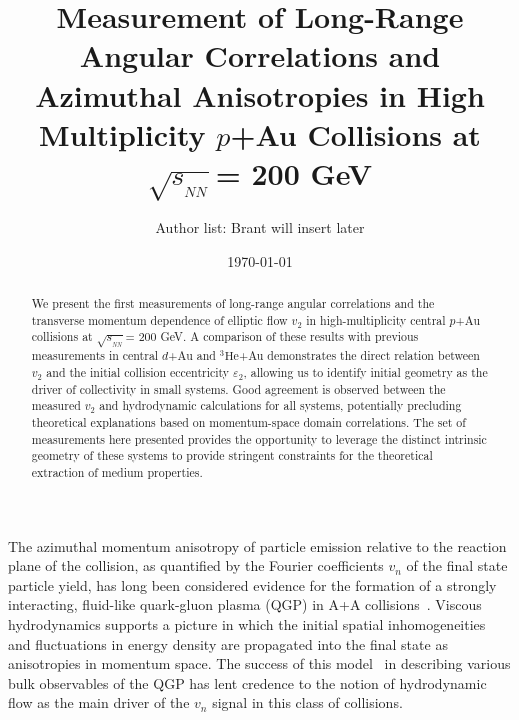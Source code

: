 \documentclass[%
reprint,
showpacs,preprintnumbers,
 amsmath,amssymb,
 aps,
]{revtex4-1}
\newcommand{\sqsn}{\mbox{$\sqrt{s_{_{NN}}}$}\xspace}
\newcommand{\dau}{\mbox{$d$+Au}\xspace}
\newcommand{\pau}{\mbox{$p$+Au}\xspace}
\newcommand{\hau}{\mbox{$^3\text{He}$+Au}\xspace}
\begin{document}
\title{Measurement of Long-Range Angular Correlations and Azimuthal Anisotropies in High Multiplicity \pau Collisions at \sqsn = 200 GeV}%

\author{Author list: Brant will insert later}

\date{\today}%

\begin{abstract}
We present the first measurements of long-range angular correlations and the transverse momentum dependence of elliptic flow $v_2$ in high-multiplicity central \pau collisions at \sqsn = 200 GeV. A comparison of these results with previous measurements in central \dau and \hau demonstrates the direct relation between $v_2$ and the initial collision eccentricity $\varepsilon_2$, allowing us to identify initial geometry as the driver of collectivity in small systems. Good agreement is observed between the measured $v_2$ and hydrodynamic calculations for all systems, potentially precluding theoretical explanations based on momentum-space domain correlations. The set of measurements here presented provides the opportunity to leverage the distinct intrinsic geometry of these systems to provide stringent constraints for the theoretical extraction of medium properties. 
\end{abstract}

\maketitle

The azimuthal momentum anisotropy of particle emission relative to the reaction plane of the collision, as quantified by the Fourier coefficients $v_n$ of the final state particle yield, has long been considered evidence for the formation of a strongly interacting, fluid-like quark-gluon plasma (QGP) in A+A collisions~\cite{Snellings:2011sz}. Viscous hydrodynamics supports a picture in which the initial spatial inhomogeneities and fluctuations in energy density are propagated into the final state as anisotropies in momentum space.  The success of this model~\cite{Luzum:2008cw} in describing various bulk observables of the QGP has lent credence to the notion of hydrodynamic flow as the main driver of the $v_{n}$ signal in this class of collisions.
\end{document}
